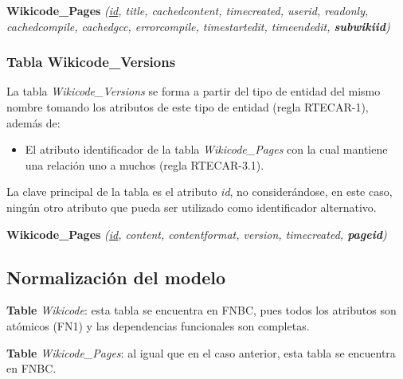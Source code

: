 \begin{description}
	\item{\textbf{Wikicode\_Pages}} \emph{(\underline{id}, title, cachedcontent, timecreated, userid, readonly, cachedcompile, cachedgcc, errorcompile, timestartedit, timeendedit, \textbf{subwikiid})}
\end{description}

\subsubsection{Tabla Wikicode\_Versions}

La tabla \emph{Wikicode\_Versions} se forma a partir del tipo de entidad del mismo nombre tomando los atributos de este tipo de entidad (regla RTECAR-1), además de:

\begin{itemize}
	\item El atributo identificador de la tabla \emph{Wikicode\_Pages} con la cual mantiene una relación uno a muchos (regla RTECAR-3.1).
\end{itemize}

La clave principal de la tabla es el atributo \emph{id}, no considerándose, en este caso, ningún otro atributo que pueda ser utilizado como identificador alternativo.

\begin{description}
	\item{\textbf{Wikicode\_Pages}} \emph{(\underline{id}, content, contentformat, version, timecreated, \textbf{pageid})}
\end{description}

\subsection{Normalización del modelo}

\begin{description}
	\item{\textbf{Table} \emph{Wikicode}}: esta tabla se encuentra en FNBC, pues todos los atributos son atómicos (FN1) y las dependencias funcionales son completas.
\end{description}

\begin{description}
	\item{\textbf{Table} \emph{Wikicode\_Pages}}: al igual que en el caso anterior, esta tabla se encuentra en FNBC.
\end{description}

